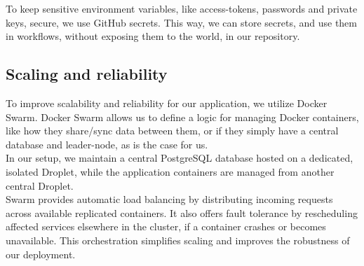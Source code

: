 To keep sensitive environment variables, like access-tokens, passwords and private keys, secure, we use GitHub secrets. This way, we can store secrets, and use them in workflows, without exposing them to the world, in our repository. 


\subsection{Scaling and reliability}
To improve scalability and reliability for our application, we utilize Docker Swarm. Docker Swarm allows us to define a logic for managing Docker containers, like how they share/sync data between them, or if they simply have a central database and leader-node, as is the case for us.\\

In our setup, we maintain a central PostgreSQL database hosted on a dedicated, isolated Droplet, while the application containers are managed from another central Droplet. \\

Swarm provides automatic load balancing by distributing incoming requests across available replicated containers. It also offers fault tolerance by rescheduling affected services elsewhere in the cluster, if a container crashes or becomes unavailable. This orchestration simplifies scaling and improves the robustness of our deployment.
